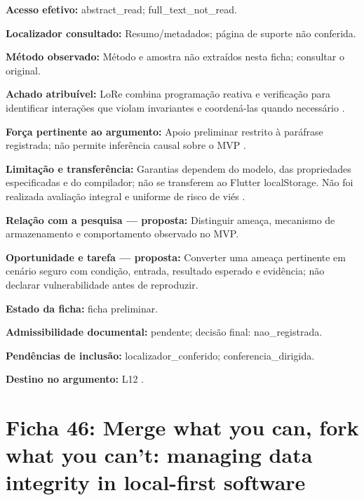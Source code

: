 \noindent\textbf{Acesso efetivo:} abstract\_read; full\_text\_not\_read.\par\medskip

\noindent\textbf{Localizador consultado:} Resumo/metadados; página de suporte não conferida.\par\medskip

\noindent\textbf{Método observado:} Método e amostra não extraídos nesta ficha; consultar o original.\par\medskip

\noindent\textbf{Achado atribuível:} LoRe combina programação reativa e verificação para identificar interações que violam invariantes e coordená-las quando necessário \citep{OS07}.\par\medskip

\noindent\textbf{Força pertinente ao argumento:} Apoio preliminar restrito à paráfrase registrada; não permite inferência causal sobre o MVP \citep{OS07}.\par\medskip

\noindent\textbf{Limitação e transferência:} Garantias dependem do modelo, das propriedades especificadas e do compilador; não se transferem ao Flutter localStorage. Não foi realizada avaliação integral e uniforme de risco de viés \citep{OS07}.\par\medskip

\noindent\textbf{Relação com a pesquisa — proposta:} Distinguir ameaça, mecanismo de armazenamento e comportamento observado no MVP.\par\medskip

\noindent\textbf{Oportunidade e tarefa — proposta:} Converter uma ameaça pertinente em cenário seguro com condição, entrada, resultado esperado e evidência; não declarar vulnerabilidade antes de reproduzir.\par\medskip

\noindent\textbf{Estado da ficha:} ficha preliminar.\par\medskip

\noindent\textbf{Admissibilidade documental:} pendente; decisão final: nao\_registrada.\par\medskip

\noindent\textbf{Pendências de inclusão:} localizador\_conferido; conferencia\_dirigida.\par\medskip

\noindent\textbf{Destino no argumento:} L12 .

\clearpage\section*{Ficha 46: Merge what you can, fork what you can't: managing data integrity in local-first software}

